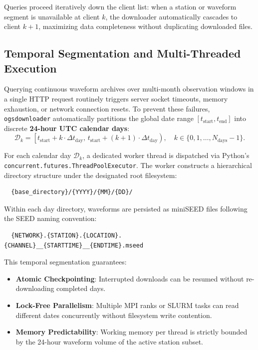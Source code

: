 Queries proceed iteratively down the client list: when a station or waveform segment is unavailable at client $k$, the downloader automatically cascades to client $k+1$, maximizing data completeness without duplicating downloaded files.

\subsection{Temporal Segmentation and Multi-Threaded Execution}
\label{subsec:temporal_segmentation}

Querying continuous waveform archives over multi-month observation windows in a single HTTP request routinely triggers server socket timeouts, memory exhaustion, or network connection resets. To prevent these failures, \texttt{ogsdownloader} automatically partitions the global date range $[t_{\mathrm{start}}, t_{\mathrm{end}}]$ into discrete \textbf{24-hour UTC calendar days}:
\begin{equation}
  \mathcal{D}_k = \left[ t_{\mathrm{start}} + k \cdot \Delta t_{\mathrm{day}},\, t_{\mathrm{start}} + (k+1) \cdot \Delta t_{\mathrm{day}} \right), \quad k \in \{0, 1, \dots, N_{\mathrm{days}}-1\}.
  \label{eq:daily_segmentation}
\end{equation}

For each calendar day $\mathcal{D}_k$, a dedicated worker thread is dispatched via Python's \texttt{concurrent.futures.ThreadPoolExecutor}. The worker constructs a hierarchical directory structure under the designated root filesystem:
\begin{verbatim}
  {base_directory}/{YYYY}/{MM}/{DD}/
\end{verbatim}
Within each day directory, waveforms are persisted as miniSEED files following the SEED naming convention:
\begin{verbatim}
  {NETWORK}.{STATION}.{LOCATION}.{CHANNEL}__{STARTTIME}__{ENDTIME}.mseed
\end{verbatim}
This temporal segmentation guarantees:
\begin{itemize}
  \item \textbf{Atomic Checkpointing}: Interrupted downloads can be resumed without re-downloading completed days.
  \item \textbf{Lock-Free Parallelism}: Multiple MPI ranks or SLURM tasks can read different dates concurrently without filesystem write contention.
  \item \textbf{Memory Predictability}: Working memory per thread is strictly bounded by the 24-hour waveform volume of the active station subset.
\end{itemize}

